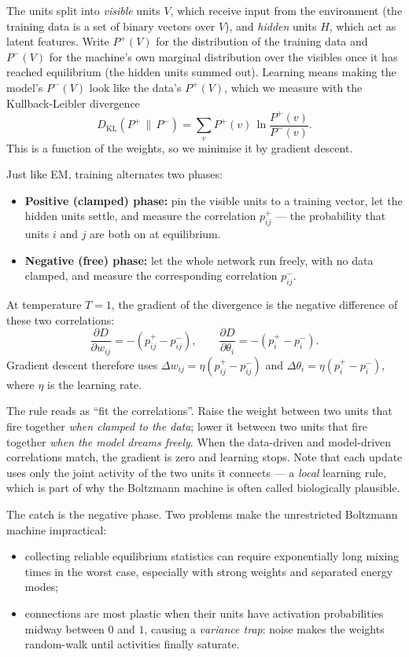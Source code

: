 \documentclass[11pt, oneside]{book}
\newcommand{\KL}[2]{D_{\mathrm{KL}}\!\left(#1 \,\|\, #2\right)}
\newcommand{\pd}[2]{\frac{\partial #1}{\partial #2}}
\begin{document}
The units split into \emph{visible} units $V$, which receive input from the
environment (the training data is a set of binary vectors over $V$), and
\emph{hidden} units $H$, which act as latent features. Write $P^+(V)$ for the
distribution of the training data and $P^-(V)$ for the machine's own marginal
distribution over the visibles once it has reached equilibrium (the hidden units
summed out). Learning means making the model's $P^-(V)$ look like the data's
$P^+(V)$, which we measure with the Kullback-Leibler divergence
\[
  \KL{P^+}{P^-} = \sum_{v} P^+(v)\, \ln \frac{P^+(v)}{P^-(v)} .
\]
This is a function of the weights, so we minimise it by gradient descent.

Just like EM, training alternates two phases:
\begin{itemize}
  \item \textbf{Positive (clamped) phase:} pin the visible units to a training
        vector, let the hidden units settle, and measure the correlation
        $p^+_{ij}$ — the probability that units $i$ and $j$ are both on at
        equilibrium.
  \item \textbf{Negative (free) phase:} let the whole network run freely, with no
        data clamped, and measure the corresponding correlation $p^-_{ij}$.
\end{itemize}
At temperature $T=1$, the gradient of the divergence is the negative difference of
these two correlations:
\[
  \pd{D}{w_{ij}} = -\left( p^+_{ij} - p^-_{ij} \right),
  \qquad
  \pd{D}{\theta_i} = -\left( p^+_{i} - p^-_{i} \right).
\]
Gradient descent therefore uses
$\Delta w_{ij}=\eta(p^+_{ij}-p^-_{ij})$ and
$\Delta\theta_i=\eta(p^+_i-p^-_i)$, where $\eta$ is the learning rate.

\begin{intbox}
The rule reads as ``fit the correlations''. Raise the weight between two units
that fire together \emph{when clamped to the data}; lower it between two units
that fire together \emph{when the model dreams freely}. When the data-driven and
model-driven correlations match, the gradient is zero and learning stops. Note
that each update uses only the joint activity of the two units it connects — a
\emph{local} learning rule, which is part of why the Boltzmann machine is often
called biologically plausible.
\end{intbox}

The catch is the negative phase. Two problems make the unrestricted Boltzmann
machine impractical:
\begin{itemize}
  \item collecting reliable equilibrium statistics can require exponentially long
        mixing times in the worst case, especially with strong weights and separated
        energy modes;
  \item connections are most plastic when their units have activation
        probabilities midway between $0$ and $1$, causing a \emph{variance trap}:
        noise makes the weights random-walk until activities finally saturate.
\end{itemize}
\end{document}
